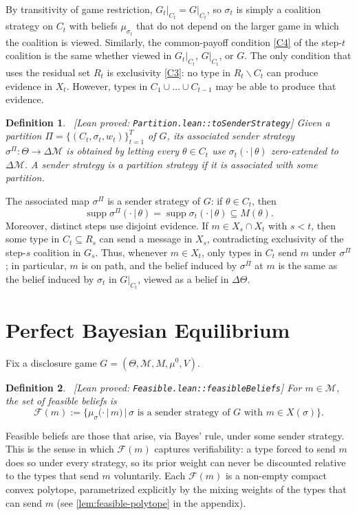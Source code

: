 \documentclass[11pt]{article}
\newtheorem{definition}{Definition}
\newcommand{\sep}{\,|\,}
\newcommand{\supp}{\operatorname{supp}}
\newcommand{\Msg}{\mathcal{M}}
\newcommand{\cups}{\cup \ldots \cup}
\newcommand{\leanproved}[1]{{\footnotesize\textsf{\textcolor{green!55!black}{[Lean proved: \texttt{#1}]}}}}
\begin{document}
By transitivity of game restriction, $G_t\vert_{C_t} = G\vert_{C_t}$, so $\sigma_t$ is simply a coalition strategy on $C_t$ with beliefs $\mu_{\sigma_t}$ that do not depend on the larger game in which the coalition is viewed. Similarly, the common-payoff condition \cref{C4} of the step-$t$ coalition is the same whether viewed in $G_t\vert_{C_t}$, $G\vert_{C_t}$, or $G$. The only condition that uses the residual set $R_t$ is exclusivity \cref{C3}: no type in $R_t \smallsetminus C_t$ can produce evidence in $X_t$. However, types in $C_1 \cups C_{t-1}$ may be able to produce that evidence.

\begin{definition}\ \leanproved{Partition.lean::toSenderStrategy}
    Given a partition $\Pi = \{ (C_t,\sigma_t,w_t) \}_{t=1}^T$ of $G$, its associated sender strategy $\sigma^{\Pi}: \Theta \to \Delta \Msg$ is obtained by letting every $\theta \in C_t$ use $\sigma_t(\cdot \sep \theta)$ zero-extended to $\Delta \Msg$. A sender strategy is a \emph{partition strategy} if it is associated with some partition.
\end{definition}
The associated map $\sigma^\Pi$ is a sender strategy of $G$: if $\theta\in C_t$, then
\[
    \supp\sigma^\Pi(\cdot\sep\theta)
    =
    \supp\sigma_t(\cdot\sep\theta)
    \subseteq M(\theta).
\]
Moreover, distinct steps use disjoint evidence. If $m\in X_s\cap X_t$ with $s<t$, then some type in $C_t\subseteq R_s$ can send a message in $X_s$, contradicting exclusivity of the step-$s$ coalition in $G_s$. Thus, whenever
$m\in X_t$, only types in $C_t$ send $m$ under $\sigma^\Pi$; in particular, $m$ is on path, and the belief induced by $\sigma^\Pi$ at $m$ is the same as the belief induced by $\sigma_t$ in $G\vert_{C_t}$, viewed as a belief in $\Delta\Theta$.

\section{Perfect Bayesian Equilibrium}\label{sec:pbe}

Fix a disclosure game $G = (\Theta,\Msg,M,\mu^0,V)$.

\begin{definition}\label{dfn:set-feasible-beliefs}\ \leanproved{Feasible.lean::feasibleBeliefs}
    For $m \in \Msg$, the \emph{set of feasible beliefs} is
    \[
        \mathcal{F}(m) := \{ \mu_\sigma (\cdot \sep m) \sep \sigma \text{ is a sender strategy of } G \text{ with } m \in X(\sigma) \}.
    \]
\end{definition}
Feasible beliefs are those that arise, via Bayes' rule, under some sender strategy. This is the sense in which $\mathcal{F}(m)$ captures verifiability: a type forced to send $m$ does so under every strategy, so its prior weight can never be discounted relative to the types that send $m$ voluntarily. Each $\mathcal{F}(m)$ is a non-empty compact convex polytope, parametrized explicitly by the mixing weights of the types that can send $m$ (see \cref{lem:feasible-polytope} in the appendix).
\end{document}

